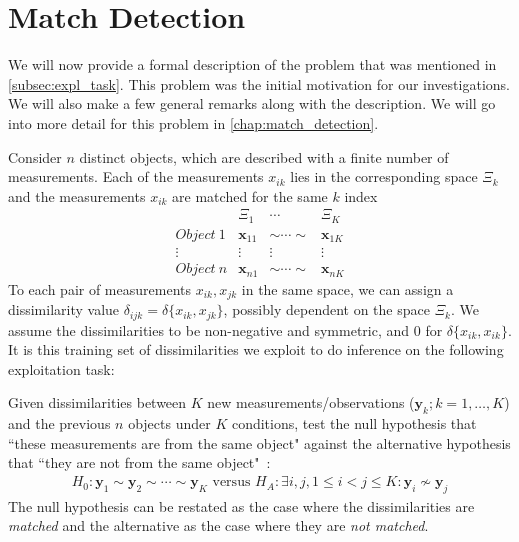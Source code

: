 \documentclass[12pt,oneside,final]{thesis}\usepackage[]{graphicx}\usepackage[]{color}
\begin{document}
\section{Match Detection}

We will now provide a formal description of the problem that was mentioned in \autoref{subsec:expl_task}. This problem was the initial motivation for our investigations. We will also make a few general remarks along with the description. We will go into more detail for this problem in  \autoref{chap:match_detection}.

Consider $n$  distinct objects, which are described with a finite number of measurements. Each of the measurements $x_{ik}$ lies in  the corresponding space $\Xi_k$ and the  measurements $x_{ik}$ are matched for the same $k$ index
\[  \begin{array}{cccc}
        & \Xi_1 & \cdots & \Xi_K\\
        Object ~ 1 & \bm{x}_{11} & \sim \cdots \sim & \bm{x}_{1K} \\
        \vdots & \vdots & \vdots & \vdots \\
        Object ~ n & \bm{x}_{n1} & \sim \cdots \sim & \bm{x}_{nK}
      \end{array}      
\]
To each pair of measurements $x_{ik},x_{jk}$ in the same space, we can assign a dissimilarity value $\delta_{ijk}=\delta\{x_{ik},x_{jk}\}$, possibly dependent on the space $\Xi_k$. We assume the dissimilarities to be non-negative and  symmetric, and 0 for $\delta\{x_{ik},x_{ik}\}$.  It is this training set of  dissimilarities we exploit to do inference on the following exploitation task:

 Given dissimilarities between  $K$ new measurements/observations ($\bm{y}_{k};k=1,\ldots,K$) and the previous $n$ objects under $K$ conditions, 
test the null hypothesis  that ``these measurements are from the same  object"  against the alternative hypothesis that ``they are not  from the same  object"~\cite{JOFC}:
    \[
\begin{array}{l}
    H_0: \bm{y}_{1} \sim \bm{y}_{2} \sim \cdots \sim \bm{y}_{K}
 \text{ versus } 
 H_A: \exists i, j , 1\leq i < j \leq K :\bm{y}_{i} \nsim \bm{y}_{j}  
\end{array}
\]
 The null hypothesis can be restated as the case where the dissimilarities are \emph{matched} and the alternative as the case where they are \emph{not matched}.
\end{document}
